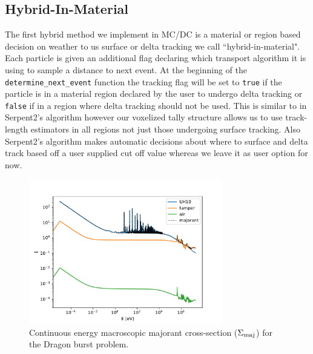 \subsection{Hybrid-In-Material}
\label{sec:material_exc}


The first hybrid method we implement in MC/DC is a material or region based decision on weather to us surface or delta tracking we call ``hybrid-in-material".
Each particle is given an additional flag declaring which transport algorithm it is using to sample a distance to next event.
At the beginning of the \texttt{determine\_next\_event} function the tracking flag will be set to \texttt{true} if the particle is in a material region declared by the user to undergo delta tracking or \texttt{false} if in a region where delta tracking should not be used. 
This is similar to in Serpent2's algorithm however our voxelized tally structure allows us to use track-length estimators in all regions not just those undergoing surface tracking.
Also Serpent2's algorithm makes automatic decisions about where to surface and delta track based off a user supplied cut off value \cite{leppanen_development_2013} whereas we leave it as user option for now.


\begin{figure}
    \centering
    \includegraphics[width=0.75\textwidth]{monte_carlo/delta_tracking/figures/macro_majorant_dragon.pdf}
    \caption{Continuous energy macroscopic majorant cross-section ($\Sigma_{\text{maj}}$) for the Dragon burst problem.}
    \label{fig:majorant_dragon}
\end{figure}

